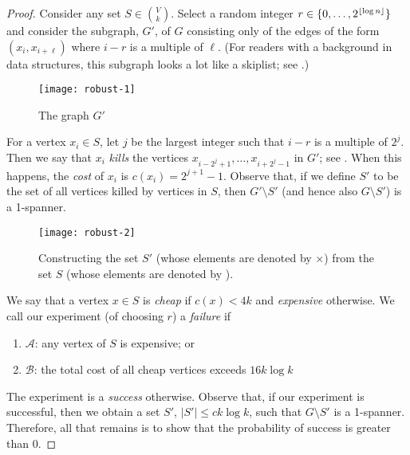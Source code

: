 \documentclass{patmorin}
\begin{document}
\begin{proof}
Consider any set $S\in\binom{V}{k}$.  Select a random integer
$r\in\{0,\ldots,2^{{\lfloor \log n \rfloor}}\}$ and consider the subgraph, $G'$,
of $G$ consisting only of the edges of the form $(x_i,x_{i+\ell})$
where $i-r$ is a multiple of $\ell$.  (For readers with a background
in data structures, this subgraph looks a lot like a skiplist; see
.)

\begin{figure}
  \begin{center}
  \texttt{[image: robust-1]}
  \end{center}
  \caption{The graph $G'$}
\end{figure}

For a vertex $x_i\in S$, let $j$ be the largest integer such that $i-r$
is a multiple of $2^j$.  Then we say that $x_i$ \emph{kills} the vertices
$x_{i-2^{j}+1},\ldots,x_{i+2^{j}-1}$ in $G'$; see .
When this happens, the \emph{cost} of $x_i$ is $c(x_i)=2^{j+1}-1$.
Observe that, if we define $S'$ to be the set of all vertices killed by
vertices in $S$, then $G'\setminus S'$ (and hence also $G\setminus S'$)
is a 1-spanner.

\begin{figure}
  \begin{center}
  \texttt{[image: robust-2]}
  \end{center}
  \caption{Constructing the set $S'$ (whose elements are denoted by $\times$)
from the set $S$ (whose elements are denoted by \textbullet).}
\end{figure}

We say that a vertex $x\in S$ is
\emph{cheap} if $c(x) < 4k$ and \emph{expensive} otherwise.
We call our experiment (of choosing $r$) a \emph{failure} if
\begin{enumerate}
  \item $\mathcal{A}$: any vertex of $S$ is expensive; or
  \item $\mathcal{B}$: the total cost of all cheap vertices exceeds $16k\log k$
\end{enumerate}
The experiment is a \emph{success} otherwise.
Observe that, if our experiment is successful, then we obtain a set $S'$,
$|S'|\le ck\log k$, such that $G\setminus S'$ is a 1-spanner.  Therefore,
all that remains is to show that the probability of success is greater than 0.


\end{proof}
\end{document}
